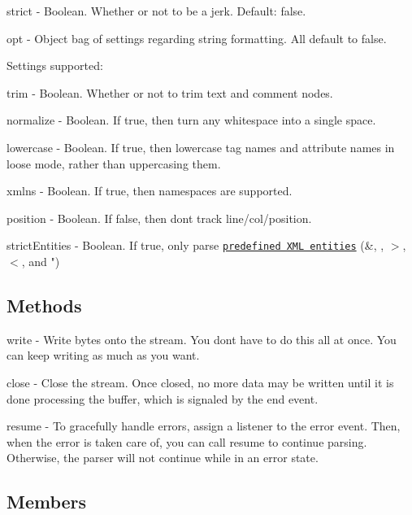 {\ttfamily strict} -\/ Boolean. Whether or not to be a jerk. Default\+: {\ttfamily false}.

{\ttfamily opt} -\/ Object bag of settings regarding string formatting. All default to {\ttfamily false}.

Settings supported\+:


\begin{DoxyItemize}
\item {\ttfamily trim} -\/ Boolean. Whether or not to trim text and comment nodes.
\item {\ttfamily normalize} -\/ Boolean. If true, then turn any whitespace into a single space.
\item {\ttfamily lowercase} -\/ Boolean. If true, then lowercase tag names and attribute names in loose mode, rather than uppercasing them.
\item {\ttfamily xmlns} -\/ Boolean. If true, then namespaces are supported.
\item {\ttfamily position} -\/ Boolean. If false, then don\textquotesingle{}t track line/col/position.
\item {\ttfamily strict\+Entities} -\/ Boolean. If true, only parse \href{http://www.w3.org/TR/REC-xml/#sec-predefined-ent}{\tt predefined X\+ML entities} ({\ttfamily \&}, {\ttfamily \textquotesingle{}}, {\ttfamily $>$}, {\ttfamily $<$}, and {\ttfamily "})
\end{DoxyItemize}

\subsection*{Methods}

{\ttfamily write} -\/ Write bytes onto the stream. You don\textquotesingle{}t have to do this all at once. You can keep writing as much as you want.

{\ttfamily close} -\/ Close the stream. Once closed, no more data may be written until it is done processing the buffer, which is signaled by the {\ttfamily end} event.

{\ttfamily resume} -\/ To gracefully handle errors, assign a listener to the {\ttfamily error} event. Then, when the error is taken care of, you can call {\ttfamily resume} to continue parsing. Otherwise, the parser will not continue while in an error state.

\subsection*{Members}

